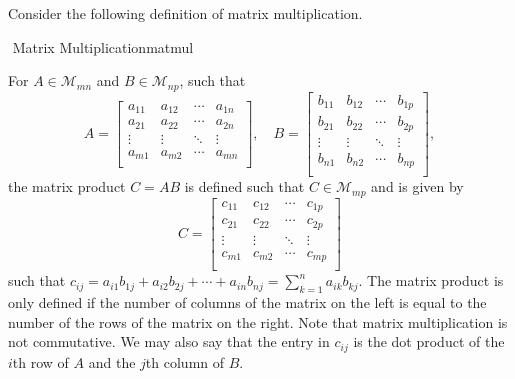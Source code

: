         Consider the following definition of matrix multiplication.
        \begin{definition}{\Stop\,\,Matrix Multiplication}{matmul}
        
            For \(A\in\mathcal{M}_{mn}\) and \(B\in\mathcal{M}_{np}\), such that
            \begin{equation*}
                A=\begin{bmatrix} 
                     a_{11} & a_{12} & \cdots & a_{1n} \\
                     a_{21} & a_{22} & \cdots & a_{2n} \\
                    \vdots & \vdots & \ddots & \vdots \\
                     a_{m1} & a_{m2} & \cdots & a_{mn} \\
                \end{bmatrix},\quad
                B=\begin{bmatrix} 
                     b_{11} & b_{12} & \cdots & b_{1p} \\
                     b_{21} & b_{22} & \cdots & b_{2p} \\
                    \vdots & \vdots & \ddots & \vdots \\
                     b_{n1} & b_{n2} & \cdots & b_{np} \\
                \end{bmatrix},
            \end{equation*}
            the matrix product \(C=AB\) is defined such that \(C\in\mathcal{M}_{mp}\) and is given by
            \begin{equation*}
                C=\begin{bmatrix} 
                     c_{11} & c_{12} & \cdots & c_{1p} \\
                     c_{21} & c_{22} & \cdots & c_{2p} \\
                    \vdots & \vdots & \ddots & \vdots \\
                     c_{m1} & c_{m2} & \cdots & c_{mp} \\
                \end{bmatrix}
            \end{equation*}
            such that \(c_{ij}=a_{i1}b_{1j}+a_{i2}b_{2j}+\cdots+a_{in}b_{nj}=\sum_{k=1}^na_{ik}b_{kj}\). The matrix product is only defined if the number of columns of the matrix on the left is equal to the number of the rows of the matrix on the right. Note that matrix multiplication is not commutative. We may also say that the entry in \(c_{ij}\) is the dot product of the \(i\)th row of \(A\) and the \(j\)th column of \(B\).
            
        \end{definition}
